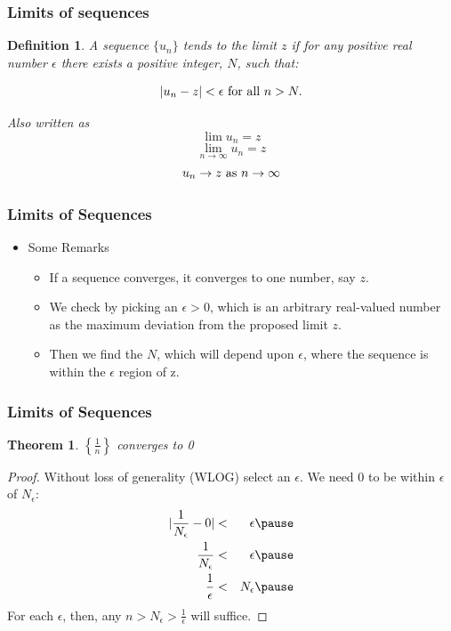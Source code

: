 \documentclass[handout]{beamer}
\newtheorem{thm}{Theorem}
\newtheorem{defn}{Definition}
\numberwithin{equation}{section}
\begin{document}
\begin{frame}
\frametitle{Limits of sequences}

\begin{defn}
A sequence $\{ u_{n} \}$ tends to the limit $z$ if for any positive real number $\epsilon$ there exists a positive integer, $N$, such that:

$$|u_n-z|<\epsilon \hbox{ for all }n>N.$$\pause

Also written as  $$\lim u_n=z$$ $$\lim_{n\rightarrow \infty}u_n=z$$ $$u_n\rightarrow z \hbox{ as } n\rightarrow \infty$$
\end{defn}

\end{frame}



\begin{frame}
\frametitle{Limits of Sequences}

\begin{itemize}
\item Some Remarks
\begin{itemize}
\item If a sequence converges, it converges to one number, say $z$. \pause
\item We check by picking an $\epsilon>0$, which is an arbitrary real-valued number as the maximum deviation from the proposed limit $z$. \pause
\item Then we find the $N$, which will depend upon $\epsilon$, where the sequence is within the $\epsilon$ region of z.
\end{itemize}
\end{itemize}

\end{frame}



\begin{frame}
\frametitle{Limits of Sequences}

\begin{thm} $\left\{ \frac{1}{n} \right\}$ converges to 0 
\end{thm} 
\pause
\begin{proof}  Without loss of generality (WLOG) select an $\epsilon$.   We need 0 to be within $\epsilon$ of $N_{\epsilon}$:\pause
\begin{eqnarray}
|\frac{ 1} {N_{\epsilon}} - 0 | & < &  \epsilon  \nonumber \pause \\
\frac{1}{N_{\epsilon}} & < & \epsilon \nonumber\pause \\
\frac{1}{\epsilon} & < &  N_{\epsilon} \nonumber \pause
\end{eqnarray}
For each $\epsilon$, then, any $n> N_{\epsilon} > \frac{1}{\epsilon}$ will suffice.
\end{proof}\pause

\end{frame}
\end{document}
